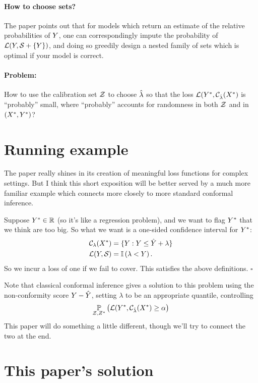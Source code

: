 \documentclass[twoside,11pt]{article}
\numberwithin{equation}{section}
\begin{document}
\paragraph{How to choose sets? }The paper points out that for models which
return an estimate of the relative probabilities of $Y$, one can
correspondingly impute the probability of $\mathcal{L}(Y, \mathcal{S} + \{Y\})$, and doing
so greedily design a nested family of sets which is optimal if your model is
correct.


\paragraph{Problem: } How to use the calibration
set $\mathcal{Z}$ to choose $\hat{\lambda}$ so that the loss
$\mathcal{L}(Y^{*}, \mathcal{C}_{\hat{\lambda}}(X^{*})$ is ``probably'' small,
where ``probably'' accounts for randomness in both $\mathcal{Z}$
and in $(X^{*}, Y^{*})$?


\section{Running example}

The paper really shines in its creation of meaningful loss functions
for complex settings.  But I think this short exposition will be 
better served by a much more familiar example which connects
more closely to more standard conformal inference.

Suppose $Y^{*} \in \mathbb{R}$ (so it's like a regression problem), and
we want to flag $Y^{*}$ that we think are too big.
So what we want is a one-sided confidence interval for $Y^{*}$:
%
\begin{align*}
%
\cfun_\lambda(\xnew) ={}& \{ \y: \y \le \yhat + \lambda \}\\
\loss(\y, \s) ={}& \ind{\lambda < \y}.
%
\end{align*}
%
So we incur a loss of one if we fail to cover.  This satisfies
the above definitions. $\square$

Note that classical conformal inference gives a solution
to this problem using the non-conformity score $Y - \hat{Y}$,
setting $\lambda$ to be an appropriate quantile,
controlling 
%
\begin{align*}
%
\p{\calset,\znew}{\loss(\ynew, \cfun_{\lambdahat}(\xnew) \ge \alpha}
%
\end{align*}
%
This paper will do something a little different, though we'll
try to connect the two at the end.


\section{This paper's solution}
\end{document}
